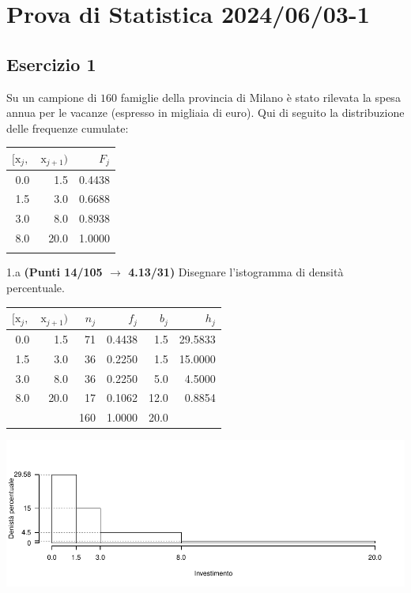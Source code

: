 \documentclass[
  11pt,
]{book}
\theoremstyle{mytheoremstyle}
\theoremstyle{mydefstyle}
\newenvironment{sol}
  {
  \begin{tcolorbox}[enhanced,breakable,arc=0.1mm,boxrule=1pt,colback=white,colframe=iblue,
  title=\bf \fontfamily{lmss}\selectfont \hspace{.5 cm} Soluzione,drop fuzzy shadow]

}{
\end{tcolorbox}
  }
\begin{document}
\section{Prova di Statistica 2024/06/03-1}\label{prova-di-statistica-20240603-1}

\subsection{Esercizio 1}\label{esercizio-1-35}

Su un campione di \(160\) famiglie della provincia di Milano è stato rilevata la spesa annua per le vacanze (espresso in migliaia di euro). Qui di seguito la distribuzione delle frequenze cumulate:

\begin{table}[H]
\centering
\begin{tabular}{rrr}
\toprule
$[\text{x}_j,$ & $\text{x}_{j+1})$ & $F_j$\\
\midrule
0.0 & 1.5 & 0.4438\\
1.5 & 3.0 & 0.6688\\
3.0 & 8.0 & 0.8938\\
8.0 & 20.0 & 1.0000\\
 &  & \\
\bottomrule
\end{tabular}
\end{table}

1.a \textbf{(Punti 14/105 \(\rightarrow\) 4.13/31)} Disegnare l'istogramma di densità percentuale.

\begin{sol}

\begin{table}[H]
\centering
\begin{tabular}{rrrrrr}
\toprule
$[\text{x}_j,$ & $\text{x}_{j+1})$ & $n_j$ & $f_j$ & $b_j$ & $h_j$\\
\midrule
0.0 & 1.5 & 71 & 0.4438 & 1.5 & 29.5833\\
1.5 & 3.0 & 36 & 0.2250 & 1.5 & 15.0000\\
3.0 & 8.0 & 36 & 0.2250 & 5.0 & 4.5000\\
8.0 & 20.0 & 17 & 0.1062 & 12.0 & 0.8854\\
 &  & 160 & 1.0000 & 20.0 & \\
\bottomrule
\end{tabular}
\end{table}

\begin{center}\includegraphics{Esami_passati_con_soluzioni_files/figure-latex/2024-43-1} \end{center}

\end{sol}
\end{document}
